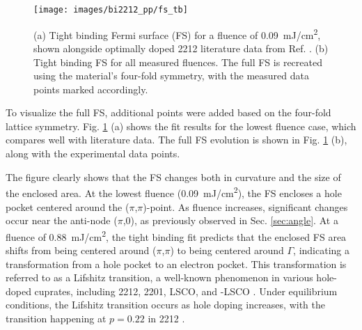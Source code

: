 \begin{figure}
	\centering
	\texttt{[image: images/bi2212\_pp/fs\_tb]}
	\caption{(a) Tight binding Fermi surface (FS) for a fluence of \qty{0.09}{\milli\joule/\centi\meter\squared}, shown alongside optimally doped 2212 literature data from Ref. \cite{kondo_hole-concentration_2004}. (b) Tight binding FS for all measured fluences. The full FS is recreated using the material's four-fold symmetry, with the measured data points marked accordingly.}
	\label{fig:fs_tb}
\end{figure}


To visualize the full FS, additional points were added based on the four-fold lattice symmetry.
Fig. \ref{fig:fs_tb} (a) shows the fit results for the lowest fluence case, which compares well with literature data.
The full FS evolution is shown in Fig. \ref{fig:fs_tb} (b), along with the experimental data points.

The figure clearly shows that the FS changes both in curvature and the size of the enclosed area.
At the lowest fluence (\qty{0.09}{\milli\joule/\centi\meter\squared}), the FS encloses a hole pocket centered around the ($\pi$,$\pi$)-point.
As fluence increases, significant changes occur near the anti-node ($\pi$,$0$), as previously observed in Sec. \ref{sec:angle}.
At a fluence of \qty{0.88}{\milli\joule/\centi\meter\squared}, the tight binding fit predicts that the enclosed FS area shifts from being centered around ($\pi$,$\pi$) to being centered around $\Gamma$, indicating a transformation from a hole pocket to an electron pocket.
This transformation is referred to as a Lifshitz transition, a well-known phenomenon in various hole-doped cuprates, including 2212, 2201, LSCO, and -LSCO \cite{kaminski_change_2006,matt_electron_2015,ding_disappearance_2019,kondo_hole-concentration_2004}.
Under equilibrium conditions, the Lifshitz transition occurs as hole doping increases, with the transition happening at $p=0.22$ in 2212 \cite{kaminski_change_2006}.

